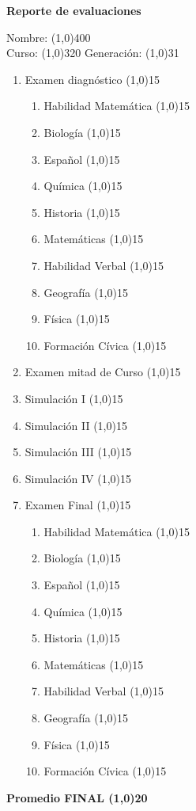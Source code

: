 \documentclass[a4paper]{article}
\newcommand{\coverPage}{
    \begin{center}
        {\Large\textbf{Reporte de evaluaciones}} \\[0.5cm]
        \begin{flushleft}
					Nombre: \line(1,0){400} \\[0.3cm]
          Curso: \line(1,0){320}
          Generación: \line(1,0){31}\\
        \end{flushleft}
    \end{center}
}
\newcommand{\puntaje}{
	\begin{enumerate}
		\item Habilidad Matemática \line(1,0){15}
		\item Biología \line(1,0){15}
		\item Español \line(1,0){15}
		\item Química \line(1,0){15}
		\item Historia \line(1,0){15}
		\item Matemáticas \line(1,0){15}
		\item Habilidad Verbal \line(1,0){15}
		\item Geografía \line(1,0){15}
		\item Física \line(1,0){15}
		\item Formación Cívica \line(1,0){15}
	\end{enumerate}

}
\begin{document}
\coverPage
\vspace{5mm}

\begin{multicols}{2}


\begin{enumerate}
  \item Examen diagnóstico \line(1,0){15}
    \puntaje
  \item Examen mitad de Curso \line(1,0){15}
  \item Simulación I \line(1,0){15}
  \item Simulación II \line(1,0){15}
  \item Simulación III \line(1,0){15}
  \item Simulación IV \line(1,0){15}

  \vfill\null\columnbreak

  \item Examen Final \line(1,0){15}
    \puntaje
\end{enumerate}


\end{multicols}

\vspace{1cm}

\begin{flushright}
  \textbf{Promedio FINAL \line(1,0){20}}

\end{flushright}
\end{document}
